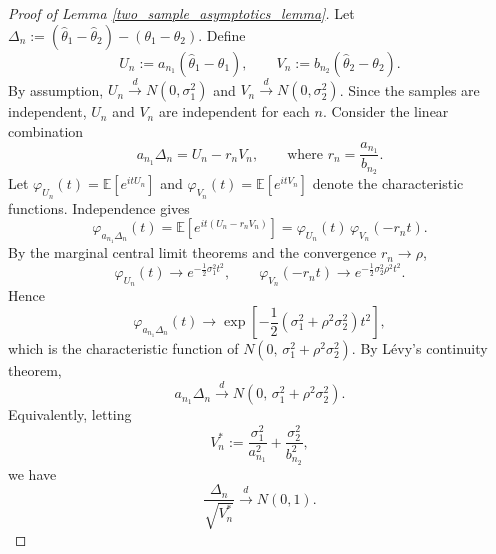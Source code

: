 \documentclass[12pt]{article}
\numberwithin{equation}{section}
\begin{document}
\begin{proof}[Proof of Lemma \ref{two_sample_asymptotics_lemma}]
Let $\Delta_n := (\hat{\theta}_1 - \hat{\theta}_2) - (\theta_1 - \theta_2)$.
Define
\[
U_n := a_{n_1}(\hat{\theta}_1 - \theta_1),
\qquad 
V_n := b_{n_2}(\hat{\theta}_2 - \theta_2).
\]
By assumption, $U_n \xrightarrow{d} N(0, \sigma_1^2)$ and $V_n \xrightarrow{d} N(0, \sigma_2^2)$. 
Since the samples are independent, $U_n$ and $V_n$ are independent for each $n$. Consider the linear combination
\[
a_{n_1}\Delta_n = U_n - r_n V_n,
\qquad \text{where } r_n = \frac{a_{n_1}}{b_{n_2}}.
\]
Let $\varphi_{U_n}(t) = \mathbb{E}[e^{itU_n}]$ and $\varphi_{V_n}(t) = \mathbb{E}[e^{itV_n}]$ denote the characteristic functions. Independence gives
\[
\varphi_{a_{n_1}\Delta_n}(t)
= \mathbb{E}[e^{it(U_n - r_n V_n)}]
= \varphi_{U_n}(t)\, \varphi_{V_n}(-r_n t).
\]
By the marginal central limit theorems and the convergence $r_n \to \rho$,
\[
\varphi_{U_n}(t) \to e^{-\frac{1}{2}\sigma_1^2 t^2},
\qquad 
\varphi_{V_n}(-r_n t) \to e^{-\frac{1}{2}\sigma_2^2 \rho^2 t^2}.
\]
Hence
\[
\varphi_{a_{n_1}\Delta_n}(t)
\to 
\exp\!\left[-\frac{1}{2}(\sigma_1^2 + \rho^2\sigma_2^2)t^2\right],
\]
which is the characteristic function of $N(0,\, \sigma_1^2 + \rho^2\sigma_2^2)$. 
By L\'evy's continuity theorem,
\[
a_{n_1}\Delta_n \xrightarrow{d} N\!\left(0,\, \sigma_1^2 + \rho^2\sigma_2^2\right).
\]
Equivalently, letting
\[
V_n^\ast := \frac{\sigma_1^2}{a_{n_1}^2} + \frac{\sigma_2^2}{b_{n_2}^2},
\]
we have
\[
\frac{\Delta_n}{\sqrt{V_n^\ast}} \xrightarrow{d} N(0,1).
\]


\end{proof}
\end{document}
